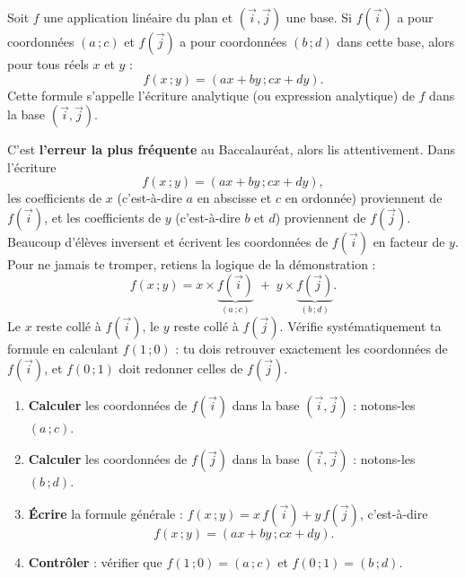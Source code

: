 \documentclass[11pt]{article}
\newcommand{\cle}[1]{{\popxbold\color{popdark}#1}}
\begin{document}
\begin{definition}
Soit $f$ une application linéaire du plan et $(\vec{i}, \vec{j})$ une base. Si $f(\vec{i})$ a pour coordonnées $(a\,; c)$ et $f(\vec{j})$ a pour coordonnées $(b\,; d)$ dans cette base, alors pour tous réels $x$ et $y$ :
\[ f(x\,; y) = (ax + by\,; cx + dy). \]
Cette formule s'appelle l'\cle{écriture analytique} (ou \cle{expression analytique}) de $f$ dans la base $(\vec{i}, \vec{j})$.
\end{definition}

\begin{attention}
C'est \textbf{l'erreur la plus fréquente} au Baccalauréat, alors lis attentivement. Dans l'écriture
\[ f(x\,; y) = (ax + by\,; cx + dy), \]
les coefficients de $x$ (c'est-à-dire $a$ en abscisse et $c$ en ordonnée) proviennent de $f(\vec{i})$, et les coefficients de $y$ (c'est-à-dire $b$ et $d$) proviennent de $f(\vec{j})$. Beaucoup d'élèves inversent et écrivent les coordonnées de $f(\vec{i})$ en facteur de $y$. Pour ne jamais te tromper, retiens la logique de la démonstration :
\[ f(x\,; y) = x \times \underbrace{f(\vec{i})}_{(a\,; c)} \;+\; y \times \underbrace{f(\vec{j})}_{(b\,; d)}. \]
Le $x$ reste collé à $f(\vec{i})$, le $y$ reste collé à $f(\vec{j})$. Vérifie systématiquement ta formule en calculant $f(1\,; 0)$ : tu dois retrouver exactement les coordonnées de $f(\vec{i})$, et $f(0\,; 1)$ doit redonner celles de $f(\vec{j})$.
\end{attention}

\begin{methode}
\begin{enumerate}
\item \textbf{Calculer} les coordonnées de $f(\vec{i})$ dans la base $(\vec{i}, \vec{j})$ : notons-les $(a\,; c)$.
\item \textbf{Calculer} les coordonnées de $f(\vec{j})$ dans la base $(\vec{i}, \vec{j})$ : notons-les $(b\,; d)$.
\item \textbf{Écrire} la formule générale : $f(x\,; y) = x\,f(\vec{i}) + y\,f(\vec{j})$, c'est-à-dire
\[ f(x\,; y) = (ax + by\,; cx + dy). \]
\item \textbf{Contrôler} : vérifier que $f(1\,; 0) = (a\,; c)$ et $f(0\,; 1) = (b\,; d)$.
\end{enumerate}
\end{methode}
\end{document}
